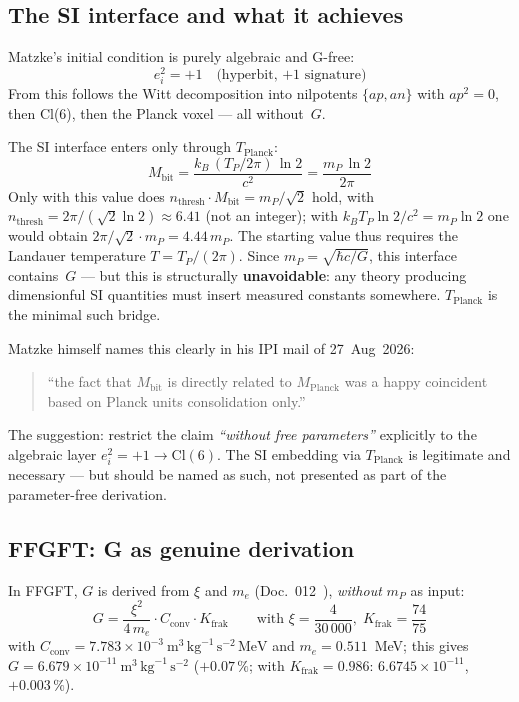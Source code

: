 \subsection{The SI interface and what it achieves}

Matzke's initial condition is purely algebraic and G-free:
\begin{equation}
  e_i^2 = +1 \quad\text{(hyperbit, $+1$ signature)}
\end{equation}
From this follows the Witt decomposition into nilpotents $\{ap, an\}$
with $ap^2=0$, then Cl(6), then the Planck voxel --- all without~$G$.

The SI interface enters only through $T_\text{Planck}$:
\begin{equation}
  M_\text{bit} = \frac{k_B\,(T_P/2\pi)\,\ln 2}{c^2} = \frac{m_P\,\ln 2}{2\pi}
\end{equation}
Only with this value does $n_\text{thresh}\cdot M_\text{bit} = m_P/\sqrt2$ hold, with
$n_\text{thresh} = 2\pi/(\sqrt2\ln2)\approx6.41$ (not an integer); with
$k_B T_P\ln2/c^2 = m_P\ln2$ one would obtain $2\pi/\sqrt2\cdot m_P = 4.44\,m_P$.
The starting value thus requires the Landauer temperature $T = T_P/(2\pi)$.
Since $m_P = \sqrt{\hbar c/G}$, this interface contains~$G$ ---
but this is structurally \textbf{unavoidable}: any theory producing
dimensionful SI quantities must insert measured constants somewhere.
$T_\text{Planck}$ is the minimal such bridge.

Matzke himself names this clearly in his IPI mail of 27~Aug~2026:
\begin{quote}
``the fact that $M_\text{bit}$ is directly related to $M_\text{Planck}$
was a happy coincident based on Planck units consolidation only.''
\end{quote}

The suggestion: restrict the claim \emph{``without free parameters''}
explicitly to the algebraic layer $e_i^2=+1\to\text{Cl}(6)$.
The SI embedding via $T_\text{Planck}$ is legitimate and necessary ---
but should be named as such, not presented as part of the
parameter-free derivation.

\subsection{FFGFT: G as genuine derivation}

In FFGFT, $G$ is derived from $\xi$ and $m_e$ (Doc.~012~\cite{Pascher012}),
\emph{without} $m_P$ as input:
\begin{equation}
  G = \frac{\xi^2}{4\,m_e}\cdot C_\text{conv}\cdot K_\text{frak}
  \qquad \text{with } \xi = \frac{4}{30\,000},\; K_\text{frak} = \frac{74}{75}
\end{equation}
with $C_\text{conv} = 7.783\times10^{-3}\ \text{m}^3\,\text{kg}^{-1}\,\text{s}^{-2}\,\text{MeV}$
and $m_e = 0.511$~MeV; this gives $G = 6.679\times10^{-11}\ \text{m}^3\,\text{kg}^{-1}\,\text{s}^{-2}$
($+0.07\,\%$; with $K_\text{frak} = 0.986$: $6.6745\times10^{-11}$, $+0.003\,\%$).

